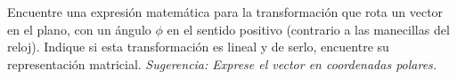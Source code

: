 \begin{resuelto}
 Encuentre una expresi\'on matemática para la transformaci\'on que rota un vector en el plano, con un ángulo $\phi$
en el sentido positivo (contrario a las manecillas del reloj). Indique si esta transformaci\'on es lineal y de serlo,
encuentre su representaci\'on matricial. \emph{Sugerencia: Exprese el vector en coordenadas polares.}
\end{resuelto}
